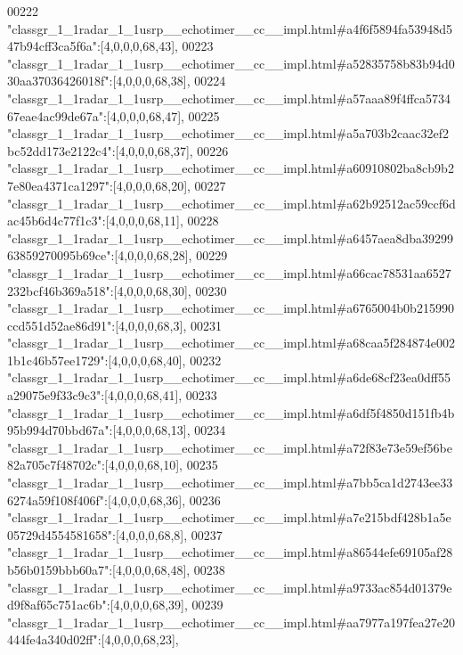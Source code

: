 \begin{DoxyCode}
00222 \textcolor{stringliteral}{"classgr\_1\_1radar\_1\_1usrp\_\_echotimer\_\_cc\_\_impl.html#a4f6f5894fa53948d547b94cff3ca5f6a"}:[4,0,0,0,68,43],
00223 \textcolor{stringliteral}{"classgr\_1\_1radar\_1\_1usrp\_\_echotimer\_\_cc\_\_impl.html#a52835758b83b94d030aa37036426018f"}:[4,0,0,0,68,38],
00224 \textcolor{stringliteral}{"classgr\_1\_1radar\_1\_1usrp\_\_echotimer\_\_cc\_\_impl.html#a57aaa89f4ffca573467eae4ac99de67a"}:[4,0,0,0,68,47],
00225 \textcolor{stringliteral}{"classgr\_1\_1radar\_1\_1usrp\_\_echotimer\_\_cc\_\_impl.html#a5a703b2caac32ef2bc52dd173e2122c4"}:[4,0,0,0,68,37],
00226 \textcolor{stringliteral}{"classgr\_1\_1radar\_1\_1usrp\_\_echotimer\_\_cc\_\_impl.html#a60910802ba8cb9b27e80ea4371ca1297"}:[4,0,0,0,68,20],
00227 \textcolor{stringliteral}{"classgr\_1\_1radar\_1\_1usrp\_\_echotimer\_\_cc\_\_impl.html#a62b92512ac59ccf6dac45b6d4c77f1c3"}:[4,0,0,0,68,11],
00228 \textcolor{stringliteral}{"classgr\_1\_1radar\_1\_1usrp\_\_echotimer\_\_cc\_\_impl.html#a6457aea8dba3929963859270095b69ce"}:[4,0,0,0,68,28],
00229 \textcolor{stringliteral}{"classgr\_1\_1radar\_1\_1usrp\_\_echotimer\_\_cc\_\_impl.html#a66cac78531aa6527232bcf46b369a518"}:[4,0,0,0,68,30],
00230 \textcolor{stringliteral}{"classgr\_1\_1radar\_1\_1usrp\_\_echotimer\_\_cc\_\_impl.html#a6765004b0b215990ccd551d52ae86d91"}:[4,0,0,0,68,3],
00231 \textcolor{stringliteral}{"classgr\_1\_1radar\_1\_1usrp\_\_echotimer\_\_cc\_\_impl.html#a68caa5f284874e0021b1c46b57ee1729"}:[4,0,0,0,68,40],
00232 \textcolor{stringliteral}{"classgr\_1\_1radar\_1\_1usrp\_\_echotimer\_\_cc\_\_impl.html#a6de68cf23ea0dff55a29075e9f33c9c3"}:[4,0,0,0,68,41],
00233 \textcolor{stringliteral}{"classgr\_1\_1radar\_1\_1usrp\_\_echotimer\_\_cc\_\_impl.html#a6df5f4850d151fb4b95b994d70bbd67a"}:[4,0,0,0,68,13],
00234 \textcolor{stringliteral}{"classgr\_1\_1radar\_1\_1usrp\_\_echotimer\_\_cc\_\_impl.html#a72f83e73e59ef56be82a705c7f48702c"}:[4,0,0,0,68,10],
00235 \textcolor{stringliteral}{"classgr\_1\_1radar\_1\_1usrp\_\_echotimer\_\_cc\_\_impl.html#a7bb5ca1d2743ee336274a59f108f406f"}:[4,0,0,0,68,36],
00236 \textcolor{stringliteral}{"classgr\_1\_1radar\_1\_1usrp\_\_echotimer\_\_cc\_\_impl.html#a7e215bdf428b1a5e05729d4554581658"}:[4,0,0,0,68,8],
00237 \textcolor{stringliteral}{"classgr\_1\_1radar\_1\_1usrp\_\_echotimer\_\_cc\_\_impl.html#a86544efe69105af28b56b0159bbb60a7"}:[4,0,0,0,68,48],
00238 \textcolor{stringliteral}{"classgr\_1\_1radar\_1\_1usrp\_\_echotimer\_\_cc\_\_impl.html#a9733ac854d01379ed9f8af65c751ac6b"}:[4,0,0,0,68,39],
00239 \textcolor{stringliteral}{"classgr\_1\_1radar\_1\_1usrp\_\_echotimer\_\_cc\_\_impl.html#aa7977a197fea27e20444fe4a340d02ff"}:[4,0,0,0,68,23],

\end{DoxyCode}
